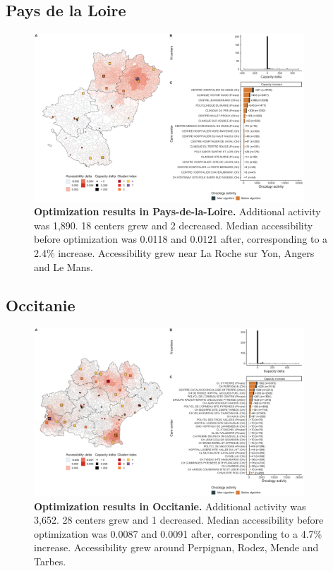 \subsection*{Pays de la Loire}

\begin{figure}[H]
    \includegraphics[width=0.9\textwidth]{images/camion/optim_region/optim_Pays-de-la-Loire.png}
    \centering
    \caption{
        \textbf{Optimization results in Pays-de-la-Loire.} Additional activity was 1,890. 18 centers grew and 2 decreased. Median accessibility before optimization was 0.0118 and 0.0121 after, corresponding to a 2.4\% increase. Accessibility grew near La Roche sur Yon, Angers and Le Mans.
    }
\end{figure}

\subsection*{Occitanie}

\begin{figure}[H]
    \includegraphics[width=0.9\textwidth]{images/camion/optim_region/optim_Occitanie.png}
    \centering
    \caption{
        \textbf{Optimization results in Occitanie.} Additional activity was 3,652. 28 centers grew and 1 decreased. Median accessibility before optimization was 0.0087 and 0.0091 after, corresponding to a 4.7\% increase. Accessibility grew around Perpignan, Rodez, Mende and Tarbes.
    }
\end{figure}


